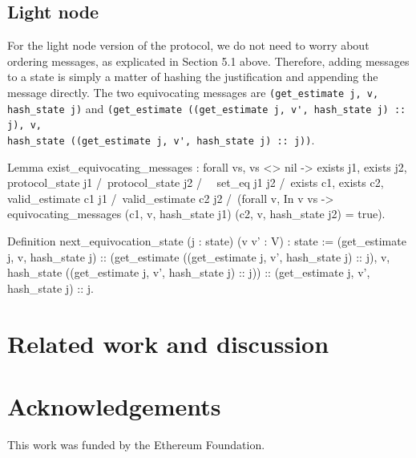 \documentclass[runningheads]{llncs}
\begin{document}
\subsection{Light node}
For the light node version of the protocol, we do not need to worry about ordering messages, as explicated in Section 5.1 above. Therefore, adding messages to a state is simply a matter of hashing the justification and appending the message directly. The two equivocating messages are \verb|(get_estimate j, v, hash_state j)| and \verb|(get_estimate ((get_estimate j, v', hash_state j) :: j), v,| \\ \verb|hash_state ((get_estimate j, v', hash_state j) :: j))|. 
\begin{coq}
Lemma exist_equivocating_messages : forall vs,
	vs <> nil ->
	exists j1, exists j2, protocol_state j1 /\ protocol_state j2 /\ ~ set_eq j1 j2 /\
	exists c1, exists c2,
	valid_estimate c1 j1 /\ valid_estimate c2 j2 /\
	(forall v,
	In v vs  ->
	equivocating_messages (c1, v, hash_state j1) 
												(c2, v, hash_state j2) = true).

Definition next_equivocation_state (j : state) (v v' : V) : state :=
	(get_estimate j, v, hash_state j)
	::
	(get_estimate ((get_estimate j, v', hash_state j) :: j), v, 
	hash_state ((get_estimate j, v', hash_state j) :: j))
	::
	(get_estimate j, v', hash_state j)
	::
	j. 
\end{coq} 

\section{Related work and discussion}
\label{sec:related}


\section{Acknowledgements} 
This work was funded by the Ethereum Foundation.
\end{document}
